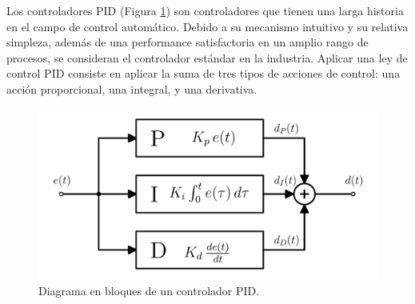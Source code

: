 Los controladores PID (Figura \ref{esquema-pid}) son controladores que tienen una larga historia en el campo de control automático. Debido a su mecanismo intuitivo y su relativa simpleza, además de una performance satisfactoria en un amplio rango de procesos, se consideran el controlador estándar en la industria. Aplicar una ley de control PID consiste en aplicar la suma de tres tipos de acciones de control: una acción proporcional, una integral, y una derivativa.

\begin{figure}[hbt!]
  \centering
  \includegraphics[width=0.45\columnwidth]{Imágenes/Diseño del control/Controlador PID.pdf}
  \caption{Diagrama en bloques de un controlador PID.}
  \label{esquema-pid}
\end{figure} 


